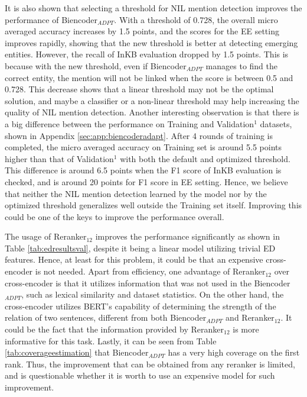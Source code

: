 \documentclass{report}
\theoremstyle{definition}
\theoremstyle{remark}
\begin{document}
It is also shown that selecting a threshold for NIL mention detection improves the performance of Biencoder$_{ADPT}$. With a threshold of 0.728, the overall micro averaged accuracy increases by 1.5 points, and the scores for the EE setting improves rapidly, showing that the new threshold is better at detecting emerging entities. However, the recall of InKB evaluation dropped by 1.5 points. This is because with the new threshold, even if Biencoder$_{ADPT}$ manages to find the correct entity, the mention will not be linked when the score is between 0.5 and 0.728. This decrease shows that a linear threshold may not be the optimal solution, and maybe a classifier or a non-linear threshold may help increasing the quality of NIL mention detection. Another interesting observation is that there is a big difference between the performance on Training and Validation$^1$ datasets, shown in Appendix \ref{sec:app:biencoderadapt}. After 4 rounds of training is completed, the micro averaged accuracy on Training set is around 5.5 points higher than that of Validation$^1$ with both the default and optimized threshold. This difference is around 6.5 points when the F1 score of InKB evaluation is checked, and is around 20 points for F1 score in EE setting. Hence, we believe that neither the NIL mention detection learned by the model nor by the optimized threshold generalizes well outside the Training set itself. Improving this could be one of the keys to improve the performance overall.

The usage of Reranker$_{12}$ improves the performance significantly as shown in Table \ref{tab:edresultsval}, despite it being a linear model utilizing trivial ED features. Hence, at least for this problem, it could be that an expensive cross-encoder is not needed. Apart from efficiency, one advantage of Reranker$_{12}$ over cross-encoder is that it utilizes information that was not used in the Biencoder$_{ADPT}$, such as lexical similarity and dataset statistics. On the other hand, the cross-encoder utilizes BERT's capability of determining the strength of the relation of two sentences, different from both Biencoder$_{ADPT}$ and Reranker$_{12}$. It could be the fact that the information provided by Reranker$_{12}$ is more informative for this task. Lastly, it can be seen from Table \ref{tab:coverageestimation} that Biencoder$_{ADPT}$ has a very high coverage on the first rank. Thus, the improvement that can be obtained from any reranker is limited, and is questionable whether it is worth to use an expensive model for such improvement.
\end{document}
